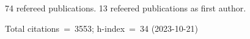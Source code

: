 74 refereed publications. 13 refeered publications as first author.

Total citations~=~3553; h-index~=~34 (2023-10-21)